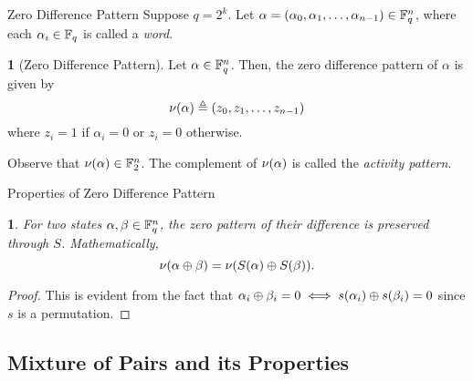 \documentclass[notheorems]{beamer}
\newtheorem{lemma}{\translate{Lemma}}
\theoremstyle{definition}
\newtheorem{definition}{\translate{Definition}}
\theoremstyle{example}
\begin{document}
    \begin{frame}{Zero Difference Pattern}
        Suppose \(q = 2^k\). Let \(\alpha = (\alpha_0, \alpha_1, \ldots,
        \alpha_{n - 1}) \in \mathbb F_q^n\), where each \(\alpha_i \in \mathbb F_q\) is
        called a \emph{word}.
        \pause
        \begin{definition}[Zero Difference Pattern]
            \label{def:zero-diff}
            Let \(\alpha \in \mathbb F_q^n\). Then, the zero difference pattern of
            \(\alpha\) is given by
            \begin{equation}
                \nu(\alpha) \triangleq (z_0, z_1, \ldots, z_{n - 1})
                \label{eq:zero-diff}
            \end{equation}
            where \(z_i = 1\) if \(\alpha_i = 0\) or \(z_i = 0\) otherwise.
        \end{definition}
        \pause
        Observe that \(\nu(\alpha) \in \mathbb F_2^n\). The complement of
        \(\nu(\alpha)\) is called the \emph{activity pattern}.
    \end{frame}

    \begin{frame}{Properties of Zero Difference Pattern}
        \begin{lemma}
            \label{lem:zero-diff-perm}
            For two states \(\alpha, \beta \in \mathbb F_q^n\), the zero pattern of
            their difference is preserved through \(S\). Mathematically,
            \begin{equation}
                \nu(\alpha \oplus \beta) = \nu(S(\alpha) \oplus S(\beta)).
                \label{eq:zero-diff-perm}
            \end{equation}
        \end{lemma}
        \pause
        \begin{proof}
            This is evident from the fact that \(\alpha_i \oplus \beta_i = 0
            \iff s(\alpha_i) \oplus s(\beta_i) = 0\) since \(s\) is a
            permutation.
        \end{proof}
    \end{frame}

    \subsection{Mixture of Pairs and its Properties}
\end{document}
